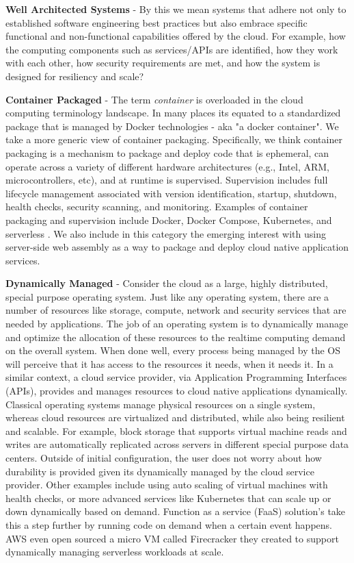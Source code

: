 \documentclass[conference]{IEEEtran}
\begin{document}
\textbf{Well Architected Systems} - By this we mean systems that adhere not only to established software engineering best practices but also embrace specific functional and non-functional capabilities offered by the cloud. For example, how the computing components such as services/APIs are identified, how they work with each other, how security requirements are met, and how the system is designed for resiliency and scale?

\textbf{Container Packaged} - The term \textit{container} is overloaded in the cloud computing terminology landscape.  In many places its equated to a standardized package\cite{OCIStandard} that is managed by Docker\cite{DockerContainer} technologies - aka "a docker container".  We take a more generic view of container packaging. Specifically, we think container packaging is a mechanism to package and deploy code that is ephemeral, can operate across a variety of different hardware architectures (e.g., Intel, ARM, microcontrollers, etc), and at runtime is supervised.  Supervision includes full lifecycle management associated with version identification, startup, shutdown, health checks, security scanning, and monitoring.  Examples of container packaging and supervision include Docker, Docker Compose, Kubernetes, and serverless \cite{baldini2017serverless}. We also include in this category the emerging interest with using server-side web assembly\cite{haas2017bringing, bosshard2020use} as a way to package and deploy cloud native application services. 

\textbf{Dynamically Managed} - Consider the cloud as a large, highly distributed, special purpose operating system. Just like any operating system, there are a number of resources like storage, compute, network and security services that are needed by applications.  The job of an operating system is to dynamically manage and optimize the allocation of these resources to the realtime computing demand on the overall system.  When done well, every process being managed by the OS will perceive that it has access to the resources it needs, when it needs it.  In a similar context, a cloud service provider, via Application Programming Interfaces (APIs), provides and manages resources to cloud native applications dynamically. Classical operating systems manage physical resources on a single system, whereas cloud resources are virtualized and distributed, while also being resilient and scalable.  For example, block storage that supports virtual machine reads and writes are automatically replicated across servers in different special purpose data centers. Outside of initial configuration, the user does not worry about how durability is provided given its dynamically managed by the cloud service provider. Other examples include using auto scaling of virtual machines with health checks, or more advanced services like Kubernetes\cite{kubernetes} that can scale up or down dynamically based on demand. Function as a service (FaaS) solution's take this a step further by running code on demand when a certain event happens.  AWS even open sourced a micro VM called Firecracker\cite{AWSFirecracker} they created to support dynamically managing serverless workloads at scale.   
\end{document}
